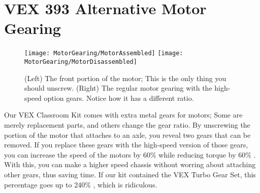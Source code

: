 \section{VEX 393 Alternative Motor Gearing}

\begin{figure}[h]
    \centering
    \texttt{[image: MotorGearing/MotorAssembled]}
    \texttt{[image: MotorGearing/MotorDisassembled]}
    \caption{
        (Left) The front portion of the motor; This is the only thing you should unscrew. (Right) The regular motor gearing with the high-speed option gears. Notice how it has a different ratio.
    }
\end{figure}

Our VEX Classroom Kit comes with extra metal gears for motors; Some are merely replacement parts, and others change the gear ratio. By unscrewing the portion of the motor that attaches to an axle, you reveal two gears that can be removed. If you replace these gears with the high-speed version of those gears, you can increase the speed of the motors by 60\% while reducing torque by 60\% \cite{VEXMotor}. With this, you can make a higher speed chassis without worring about attaching other gears, thus saving time. If our kit contained the VEX Turbo Gear Set, this percentage goes up to 240\% \cite{VEXMotor}, which is ridiculous.
